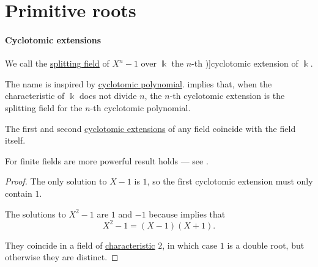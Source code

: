 \section{Primitive roots}\label{sec:primitive_elements}

\paragraph{Cyclotomic extensions}

\begin{definition}\label{def:cyclotomic_extension}
  We call the \hyperref[def:splitting_field]{splitting field} of \( X^n - 1 \) over \( \Bbbk \) the \( n \)-th \term[ru=круговое / циклотомическое (поле разложения) (\cite[204]{Кострикин2001АлгебраЧасть3})]{cyclotomic extension} of \( \Bbbk \).
\end{definition}
\begin{comments}
  \item The name is inspired by \hyperref[def:cyclotomic_polynomial]{cyclotomic polynomial}.  implies that, when the characteristic of \( \Bbbk \) does not divide \( n \), the \( n \)-th cyclotomic extension is the splitting field for the \( n \)-th cyclotomic polynomial.
\end{comments}

\begin{proposition}\label{thm:small_cyclotomic_extensions}
  The first and second \hyperref[def:cyclotomic_extension]{cyclotomic extensions} of any field coincide with the field itself.
\end{proposition}
\begin{comments}
  \item For finite fields are more powerful result holds --- see .
\end{comments}
\begin{proof}
  The only solution to \( X - 1 \) is \( 1 \), so the first cyclotomic extension must only contain \( 1 \).

  The solutions to \( X^2 - 1 \) are \( 1 \) and \( -1 \) because  implies that
  \begin{equation*}
    X^2 - 1 = (X - 1)(X + 1).
  \end{equation*}

  They coincide in a field of \hyperref[def:ring_characteristic]{characteristic} \( 2 \), in which case \( 1 \) is a double root, but otherwise they are distinct.
\end{proof}

